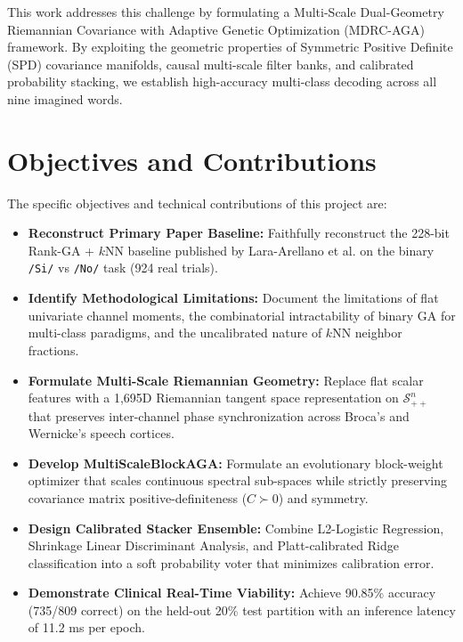 \documentclass[10pt,twocolumn,a4paper]{article}
\begin{document}
This work addresses this challenge by formulating a Multi-Scale Dual-Geometry Riemannian Covariance with Adaptive Genetic Optimization (MDRC-AGA) framework. By exploiting the geometric properties of Symmetric Positive Definite (SPD) covariance manifolds, causal multi-scale filter banks, and calibrated probability stacking, we establish high-accuracy multi-class decoding across all nine imagined words.

\section{Objectives and Contributions}
The specific objectives and technical contributions of this project are:
\begin{itemize}
    \item \textbf{Reconstruct Primary Paper Baseline:} Faithfully reconstruct the 228-bit Rank-GA + $k$NN baseline published by Lara-Arellano et al. \cite{lara2025feature} on the binary \texttt{/Si/} vs \texttt{/No/} task (924 real trials).
    \item \textbf{Identify Methodological Limitations:} Document the limitations of flat univariate channel moments, the combinatorial intractability of binary GA for multi-class paradigms, and the uncalibrated nature of $k$NN neighbor fractions.
    \item \textbf{Formulate Multi-Scale Riemannian Geometry:} Replace flat scalar features with a 1,695D Riemannian tangent space representation on $\mathcal{S}_{++}^n$ that preserves inter-channel phase synchronization across Broca's and Wernicke's speech cortices.
    \item \textbf{Develop MultiScaleBlockAGA:} Formulate an evolutionary block-weight optimizer that scales continuous spectral sub-spaces while strictly preserving covariance matrix positive-definiteness ($C \succ 0$) and symmetry.
    \item \textbf{Design Calibrated Stacker Ensemble:} Combine L2-Logistic Regression, Shrinkage Linear Discriminant Analysis, and Platt-calibrated Ridge classification into a soft probability voter that minimizes calibration error.
    \item \textbf{Demonstrate Clinical Real-Time Viability:} Achieve 90.85\% accuracy (735/809 correct) on the held-out 20\% test partition with an inference latency of 11.2 ms per epoch.
\end{itemize}
\end{document}
